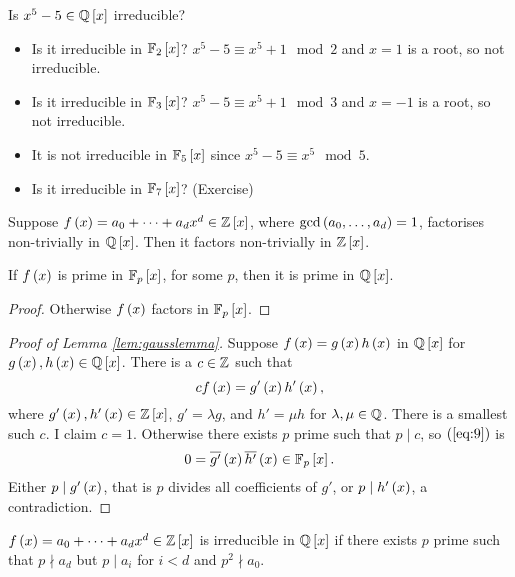 \begin{example*}
Is $ x^5 - 5 \in \mathbb{Q}\left[ x \right] $ irreducible?
\begin{itemize}
\item Is it irreducible in $ \mathbb{F}_2\left[ x \right] $? $ x^5 - 5 \equiv x^5 + 1 \mod 2 $ and $ x = 1 $ is a root, so not irreducible.
\item Is it irreducible in $ \mathbb{F}_3\left[ x \right] $? $ x^5 - 5 \equiv x^5 + 1 \mod 3 $ and $ x = -1 $ is a root, so not irreducible.
\item It is not irreducible in $ \mathbb{F}_5\left[ x \right] $ since $ x^5 - 5 \equiv x^5 \mod 5 $.
\item Is it irreducible in $ \mathbb{F}_7\left[ x \right] $? (Exercise)
\end{itemize}
\end{example*}

\begin{lemma}
\label{lem:gausslemma}
Suppose $ f\left( x \right) = a_0 + \dots + a_dx^d \in \mathbb{Z}\left[ x \right] $, where $ \gcd\left( a_0, \dots, a_d \right) = 1 $, factorises non-trivially in $ \mathbb{Q}\left[ x \right] $. Then it factors non-trivially in $ \mathbb{Z}\left[ x \right] $.
\end{lemma}

\begin{corollary}
If $ f\left( x \right) $ is prime in $ \mathbb{F}_p\left[ x \right] $, for some $ p $, then it is prime in $ \mathbb{Q}\left[ x \right] $.
\end{corollary}

\begin{proof}
Otherwise $ f\left( x \right) $ factors in $ \mathbb{F}_p\left[ x \right] $.
\end{proof}

\begin{proof}[Proof of Lemma \ref{lem:gausslemma}]
Suppose $ f\left( x \right) = g\left( x \right)h\left( x \right) $ in $ \mathbb{Q}\left[ x \right] $ for $ g\left( x \right), h\left( x \right) \in \mathbb{Q}\left[ x \right] $. There is a $ c \in \mathbb{Z} $ such that
\begin{equation}
\label{eq:9}
cf\left( x \right) = g'\left( x \right)h'\left( x \right),
\end{equation}
where $ g'\left( x \right), h'\left( x \right) \in \mathbb{Z}\left[ x \right] $, $ g' = \lambda g $, and $ h' = \mu h $ for $ \lambda, \mu \in \mathbb{Q} $. There is a smallest such $ c $. I claim $ c = 1 $. Otherwise there exists $ p $ prime such that $ p \mid c $, so $ \left( \ref{eq:9} \right) $ is
$$ 0 = \overline{g'}\left( x \right)\overline{h'}\left( x \right) \in \mathbb{F}_p\left[ x \right]. $$
Either $ p \mid g'\left( x \right) $, that is $ p $ divides all coefficients of $ g' $, or $ p \mid h'\left( x \right) $, a contradiction.
\end{proof}

\begin{corollary}[Eisenstein]
$ f\left( x \right) = a_0 + \dots + a_dx^d \in \mathbb{Z}\left[ x \right] $ is irreducible in $ \mathbb{Q}\left[ x \right] $ if there exists $ p $ prime such that $ p \nmid a_d $ but $ p \mid a_i $ for $ i < d $ and $ p^2 \nmid a_0 $.
\end{corollary}

